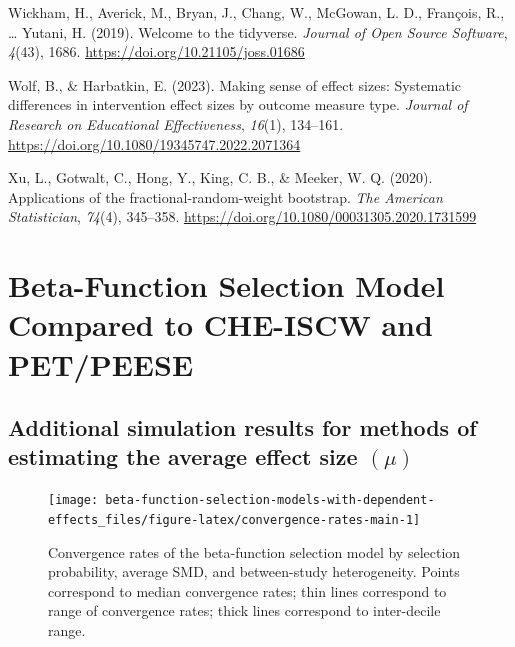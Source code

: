 \documentclass[
  man, donotrepeattitle,floatsintext]{apa7}
\newlength{\cslhangindent}
\newenvironment{CSLReferences}[2] %
 {\begin{list}{}{%
  \setlength{\itemindent}{0pt}
  \setlength{\leftmargin}{0pt}
  \setlength{\parsep}{0pt}
  \ifodd #1
   \setlength{\leftmargin}{\cslhangindent}
   \setlength{\itemindent}{-1\cslhangindent}
  \fi
  \setlength{\itemsep}{#2\baselineskip}}}
 {\end{list}}
\begin{document}
\begin{CSLReferences}{1}{0}
Wickham, H., Averick, M., Bryan, J., Chang, W., McGowan, L. D., François, R., \ldots{} Yutani, H. (2019). Welcome to the {tidyverse}. \emph{Journal of Open Source Software}, \emph{4}(43), 1686. \url{https://doi.org/10.21105/joss.01686}

Wolf, B., \& Harbatkin, E. (2023). Making sense of effect sizes: Systematic differences in intervention effect sizes by outcome measure type. \emph{Journal of Research on Educational Effectiveness}, \emph{16}(1), 134--161. \url{https://doi.org/10.1080/19345747.2022.2071364}

Xu, L., Gotwalt, C., Hong, Y., King, C. B., \& Meeker, W. Q. (2020). Applications of the fractional-random-weight bootstrap. \emph{The American Statistician}, \emph{74}(4), 345--358. \url{https://doi.org/10.1080/00031305.2020.1731599}

\end{CSLReferences}

\endgroup

\appendix


\section{Beta-Function Selection Model Compared to CHE-ISCW and PET/PEESE}\label{beta-function-selection-model-compared-to-che-iscw-and-petpeese}

\subsection{\texorpdfstring{Additional simulation results for methods of estimating the average effect size \((\mu)\)}{Additional simulation results for methods of estimating the average effect size (\textbackslash mu)}}\label{mu-simulation-results-main}

\begin{figure}
\texttt{[image: beta-function-selection-models-with-dependent-effects\_files/figure-latex/convergence-rates-main-1]} \caption{Convergence rates of the beta-function selection model by selection probability, average SMD, and between-study heterogeneity. Points correspond to median convergence rates; thin lines correspond to range of convergence rates; thick lines correspond to inter-decile range.}\label{fig:convergence-rates-main}
\end{figure}
\end{document}
